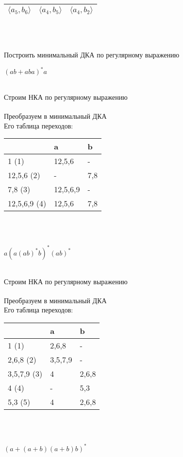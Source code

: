 \documentclass[10pt]{article}
\begin{document}
\begin{enumerate}
\begin{enumerate}[label*=\arabic*.]
\begin{itemize}
\begin{tabular}{ | l | l | l | }
				$\langle a_5,b_6\rangle$ & $\langle a_4,b_5\rangle$ & $\langle a_4,b_2\rangle$ \\
				\hline
			\end{tabular}
			\\
			\\
		\end{itemize}
	\end{enumerate}
	{\Large\item Построить минимальный ДКА по регулярному выражению}
	\begin{enumerate}[label*=\arabic*.]
		{\large\item $(ab+aba)^*a$} \\
		Строим НКА по регулярному выражению\\
		\\
		Преобразуем в минимальный ДКА\\
		Его таблица переходов:
		\begin{tabular}{ | l | l | l | }
			\hline
			& a & b \\ \hline
			1 (1) & 12,5,6 & - \\
			12,5,6 (2) & - & 7,8 \\
			7,8 (3) & 12,5,6,9 & - \\
			12,5,6,9 (4) & 12,5,6 & 7,8 \\
			\hline
		\end{tabular}\\
		\\
		{\large\item $a(a(ab)^*b)^*(ab)^*$} \\
		Строим НКА по регулярному выражению\\
		\\
		Преобразуем в минимальный ДКА\\
		Его таблица переходов:
		\begin{tabular}{ | l | l | l | }
			\hline
			& a & b \\ \hline
			1 (1) & 2,6,8 & - \\
			2,6,8 (2) & 3,5,7,9 & - \\
			3,5,7,9 (3) & 4 & 2,6,8 \\
			4 (4) & - & 5,3 \\
			5,3 (5) & 4 & 2,6,8\\
			\hline
		\end{tabular}\\
		\\
		{\large\item $(a+(a+b)(a+b)b)^*$} \\

\end{enumerate}
\end{enumerate}
\end{document}
